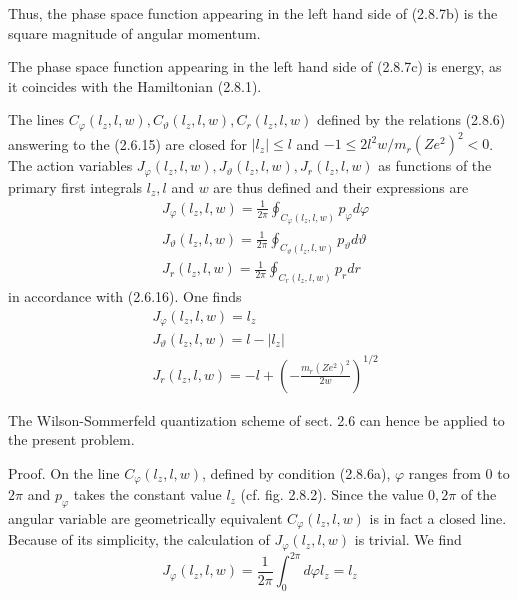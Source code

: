 \documentclass{article}
\begin{document}
Thus, the phase space function appearing in the left hand side of (2.8.7b) is the square magnitude of angular momentum.

The phase space function appearing in the left hand side of (2.8.7c) is energy, as it coincides with the Hamiltonian (2.8.1).

The lines $C_{\varphi}\left(l_{z}, l, w\right), C_{\vartheta}\left(l_{z}, l, w\right), C_{r}\left(l_{z}, l, w\right)$ defined by the relations (2.8.6) answering to the (2.6.15) are closed for $\left|l_{z}\right| \leq l$ and $-1 \leq 2 l^{2} w / m_{r}\left(Z e^{2}\right)^{2}<0$. The action variables $J_{\varphi}\left(l_{z}, l, w\right), J_{\vartheta}\left(l_{z}, l, w\right), J_{r}\left(l_{z}, l, w\right)$ as functions of the primary first integrals $l_{z}, l$ and $w$ are thus defined and their expressions are
$$
\begin{align*}
& J_{\varphi}\left(l_{z}, l, w\right)=\frac{1}{2 \pi} \oint_{C_{\varphi}\left(l_{z}, l, w\right)} p_{\varphi} d \varphi  \tag{2.8.14a}\\
& J_{\vartheta}\left(l_{z}, l, w\right)=\frac{1}{2 \pi} \oint_{C_{\vartheta}\left(l_{z}, l, w\right)} p_{\vartheta} d \vartheta  \tag{2.8.14b}\\
& J_{r}\left(l_{z}, l, w\right)=\frac{1}{2 \pi} \oint_{C_{r}\left(l_{z}, l, w\right)} p_{r} d r \tag{2.8.14c}
\end{align*}
$$
in accordance with (2.6.16). One finds
$$
\begin{align*}
& J_{\varphi}\left(l_{z}, l, w\right)=l_{z}  \tag{2.8.15a}\\
& J_{\vartheta}\left(l_{z}, l, w\right)=l-\left|l_{z}\right|  \tag{2.8.15b}\\
& J_{r}\left(l_{z}, l, w\right)=-l+\left(-\frac{m_{r}\left(Z e^{2}\right)^{2}}{2 w}\right)^{1 / 2} \tag{2.8.15c}
\end{align*}
$$

The Wilson-Sommerfeld quantization scheme of sect. 2.6 can hence be applied to the present problem.

Proof. On the line $C_{\varphi}\left(l_{z}, l, w\right)$, defined by condition (2.8.6a), $\varphi$ ranges from 0 to $2 \pi$ and $p_{\varphi}$ takes the constant value $l_{z}$ (cf. fig. 2.8.2). Since the value $0,2 \pi$ of the angular variable are geometrically equivalent $C_{\varphi}\left(l_{z}, l, w\right)$ is in fact a closed line. Because of its simplicity, the calculation of $J_{\varphi}\left(l_{z}, l, w\right)$ is trivial. We find
$$
\begin{equation*}
J_{\varphi}\left(l_{z}, l, w\right)=\frac{1}{2 \pi} \int_{0}^{2 \pi} d \varphi l_{z}=l_{z} \tag{2.8.16}
\end{equation*}
$$
\end{document}
